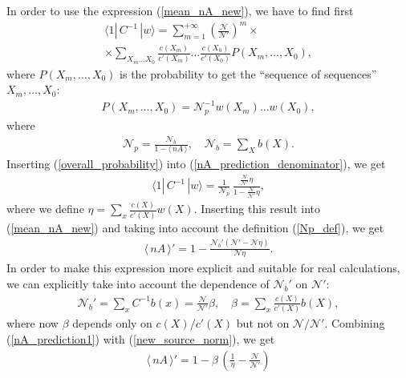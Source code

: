 \documentclass[twocolumn,showpacs,preprintnumbers,superscriptaddress,amsmath,floatfix,amssymb,secnumarabic]{revtex4}
\newcommand{\lr}[1]{ \left( #1 \right) }
\newcommand{\vev}[1]{ \langle \, #1 \, \rangle }
\newcommand{\ket}[1]{ \, | #1 \rangle }
\newcommand{\bra}[1]{ \langle #1 | \, }
\begin{document}
 In order to use the expression (\ref{mean_nA_new}), we have to find first
\begin{eqnarray}
\label{nA_prediction_denominator1}
 \bra{1} C^{-1} \ket{w} = \sum\limits_{m=1}^{+\infty} \lr{\frac{\mathcal{N}}{\mathcal{N}'}}^m
 \times \nonumber \\ \times
 \sum\limits_{X_m \ldots X_0}
 \frac{c\lr{X_m}}{c'\lr{X_m}} \ldots \frac{c\lr{X_0}}{c'\lr{X_0}} P\lr{X_m, \ldots, X_0} ,
\end{eqnarray}
where $P\lr{X_m, \ldots, X_0}$ is the probability to get the ``sequence of sequences'' $X_m, \ldots, X_0$:
\begin{eqnarray}
\label{overall_probability}
 P\lr{X_m, \ldots, X_0} = \mathcal{N}_p^{-1} w\lr{X_m} \ldots w\lr{X_0} ,
\end{eqnarray}
where
\begin{eqnarray}
\label{Np_def}
 \mathcal{N}_p = \frac{\mathcal{N}_b}{1 - \vev{nA}}, \quad
 \mathcal{N}_b = \sum\limits_X b\lr{X} .
\end{eqnarray}
Inserting (\ref{overall_probability}) into (\ref{nA_prediction_denominator}), we get
\begin{eqnarray}
\label{nA_prediction_denominator}
 \bra{1} C^{-1} \ket{w} = \frac{1}{\mathcal{N}_p} \, \frac{\frac{\mathcal{N}}{\mathcal{N}'} \eta}{1 - \frac{\mathcal{N}}{\mathcal{N}'} \eta},
\end{eqnarray}
where we define $\eta = \sum\limits_x \frac{c\lr{X}}{c'\lr{X}} w\lr{X}$. Inserting this result into (\ref{mean_nA_new}) and taking into account the definition (\ref{Np_def}), we get
\begin{eqnarray}
\label{nA_prediction1}
 \vev{nA}' = 1 - \frac{\mathcal{N}_b' \lr{\mathcal{N}' - \mathcal{N} \eta}}{\mathcal{N} \eta} .
\end{eqnarray}
In order to make this expression more explicit and suitable for real calculations, we can explicitly take into account the dependence of $\mathcal{N}_b'$ on $\mathcal{N}'$:
\begin{eqnarray}
\label{new_source_norm}
 \mathcal{N}_b' = \sum\limits_x C^{-1} b\lr{x} = \frac{\mathcal{N}}{\mathcal{N}'} \beta,
 \quad \beta = \sum\limits_x \frac{c\lr{X}}{c'\lr{X}} b\lr{X} ,
\end{eqnarray}
where now $\beta$ depends only on $c\lr{X}/c'\lr{X}$ but not on $\mathcal{N}/\mathcal{N}'$. Combining (\ref{nA_prediction1}) with (\ref{new_source_norm}), we get
\begin{eqnarray}
\label{nA_prediction}
 \vev{nA}' = 1 - \beta \, \lr{\frac{1}{\eta} - \frac{\mathcal{N}}{\mathcal{N}'}}
\end{eqnarray}
\end{document}
